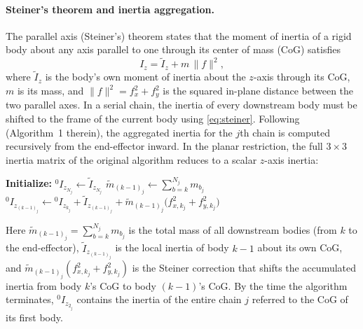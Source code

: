 \documentclass[11pt]{article}
\theoremstyle{definition}
\begin{document}
\paragraph{Steiner's theorem and inertia aggregation.}
The parallel axis (Steiner's) theorem states that the moment of inertia of a rigid body about any axis parallel to one through its center of mass (CoG) satisfies
\begin{equation} \label{eq:steiner}
    I_z = \tilde{I}_z + m\,\|f\|^2,
\end{equation}
where $\tilde{I}_z$ is the body's own moment of inertia about the $z$-axis through its CoG, $m$ is its mass, and $\|f\|^2 = f_x^2 + f_y^2$ is the squared in-plane distance between the two parallel axes. In a serial chain, the inertia of every downstream body must be shifted to the frame of the current body using \eqref{eq:steiner}. Following \cite{Al-Rawashdeh2022_Caracterization} (Algorithm~1 therein), the aggregated inertia for the $j$th chain is computed recursively from the end-effector inward. In the planar restriction, the full $3\times3$ inertia matrix of the original algorithm reduces to a scalar $z$-axis inertia:

\begin{algorithm}[H]
\caption{Planar inertia aggregation for the $j$th chain — planar reduction of Algorithm~1 in \cite{Al-Rawashdeh2022_Caracterization}}
\begin{algorithmic}[1]
\State \textbf{Initialize:} $^0I_{z_{N_j}} \leftarrow \tilde{I}_{z_{N_j}}$
        \State $\tilde{m}_{(k-1)_j} \leftarrow \displaystyle\sum_{b=k}^{N_j} m_{b_j}$
        \State $^0I_{z_{(k-1)_j}} \leftarrow {}^0I_{z_{k_j}} + \tilde{I}_{z_{(k-1)_j}} + \tilde{m}_{(k-1)_j}\bigl(f_{x,k_j}^2 + f_{y,k_j}^2\bigr)$
    \EndFor
\EndIf
\end{algorithmic}
\end{algorithm}

Here $\tilde{m}_{(k-1)_j} = \sum_{b=k}^{N_j} m_{b_j}$ is the total mass of all downstream bodies (from $k$ to the end-effector), $\tilde{I}_{z_{(k-1)_j}}$ is the local inertia of body $k-1$ about its own CoG, and $\tilde{m}_{(k-1)_j}(f_{x,k_j}^2 + f_{y,k_j}^2)$ is the Steiner correction that shifts the accumulated inertia from body $k$'s CoG to body $(k-1)$'s CoG. By the time the algorithm terminates, $^0I_{z_{2_j}}$ contains the inertia of the entire chain $j$ referred to the CoG of its first body.
\end{document}
